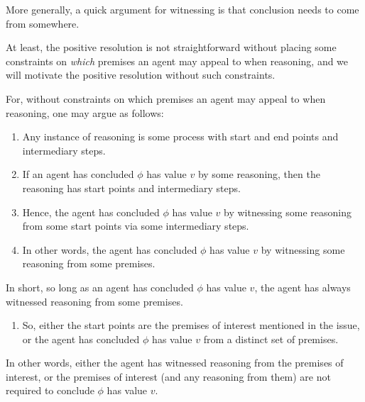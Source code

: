 \begin{note}
  More generally, a quick argument for witnessing is that conclusion needs to come from somewhere.
\end{note}

\begin{note}
  At least, the positive resolution is not straightforward without placing some constraints on \emph{which} premises an agent may appeal to when reasoning, and we will motivate the positive resolution without such constraints.

  For, without constraints on which premises an agent may appeal to when reasoning, one may argue as follows:
  \begin{enumerate}
  \item
    Any instance of reasoning is some process with start and end points and intermediary steps.
  \item
    If an agent has concluded \(\phi\) has value \(v\) by some reasoning, then the reasoning has start points and intermediary steps.
  \item
    Hence, the agent has concluded \(\phi\) has value \(v\) by witnessing some reasoning from some start points via some intermediary steps.
  \item
    In other words, the agent has concluded \(\phi\) has value \(v\) by witnessing some reasoning from some premises.
  \end{enumerate}

  In short, so long as an agent has concluded \(\phi\) has value \(v\), the agent has always witnessed reasoning from some premises.

  \begin{enumerate}[resume]
  \item
    So, either the start points are the premises of interest mentioned in the issue, or the agent has concluded \(\phi\) has value \(v\) from a distinct set of premises.
  \end{enumerate}

  In other words, either the agent has witnessed reasoning from the premises of interest, or the premises of interest (and any reasoning from them) are not required to conclude \(\phi\) has value \(v\).
\end{note}

